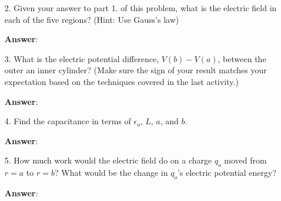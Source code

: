 \documentclass{article}
\begin{document}
\begin{enumerate}

  \item[2.] Given your answer to part 1. of this problem, what is the electric field in each of the five regions? (Hint: Use Gauss's law)

            \ifsolutions
            \textbf{Answer}:
            \else
            \vskip 96pt
            \fi

  \item[3.] What is the electric potential difference, $V(b)-V(a)$, between the outer an inner cylinder? (Make sure the sign of your result matches your expectation based on the techniques covered in the last activity.)

            \ifsolutions
            \textbf{Answer}:
            \else
            \vskip 96pt
            \fi

  \item[4.] Find the capacitance in terms of $\epsilon_o$, $L$, $a$, and $b$.

            \ifsolutions
            \textbf{Answer}:
            \else
            \vskip 120pt
            \fi

  \item[5.] How much work would the electric field do on a charge $q_o$ moved from $r=a$ to $r=b$? What would be the change in $q_o$'s electric potential energy?

            \ifsolutions
            \textbf{Answer}:
            \fi

\end{enumerate}
\end{document}
